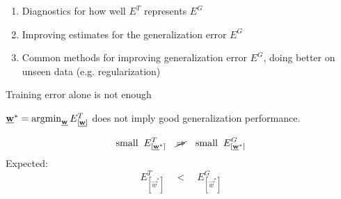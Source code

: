 \begin{frame}
\begin{enumerate}
\item Diagnostics for how well $E^T$ represents $E^G$
\item Improving estimates for the generalization error $E^G$
\item Common methods for improving generalization error $E^G$, doing better on unseen data (e.g. regularization)
\end{enumerate} 

\end{frame}



\begin{frame}{Training error alone is not enough}

$\vec w^* = \argmin_{\vec w} E^T_{[\vec w]}$ does not imply good generalization performance.

\begin{equation}
\text{small} \;\; E^T_{[\vec w^*]} \quad \cancel{\Rightarrow}\quad \text{small} \;\;  E^G_{[\vec w^*]}
\end{equation}
Expected:
\begin{equation}
E^T_{[\vec w^*]} \quad <\quad E^G_{[\vec w^*]}
\end{equation}

\end{frame}

